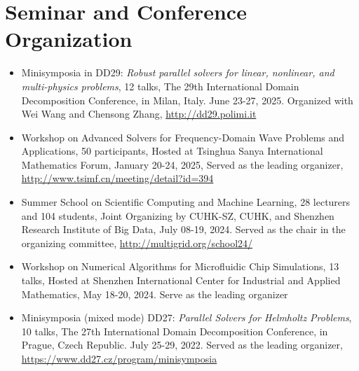 \documentclass[letterpaper]{article}
\begin{document}
\section*{Seminar and Conference Organization}
\begin{itemize}[leftmargin=*]
\item  Minisymposia in DD29: \emph{Robust parallel solvers for linear, nonlinear, and multi-physics problems}, 12 talks,
The 29th International Domain Decomposition Conference, in Milan, Italy. June 23-27, 2025. Organized with Wei Wang and Chensong Zhang, \url{http://dd29.polimi.it}

\item Workshop on Advanced Solvers for Frequency-Domain Wave Problems and Applications, 50 participants, Hosted at Tsinghua Sanya International Mathematics Forum, January 20-24, 2025, Served as the leading organizer,  \url{http://www.tsimf.cn/meeting/detail?id=394} 

\item Summer School on Scientific Computing and Machine Learning, 28 lecturers and 104 students, Joint Organizing by CUHK-SZ, CUHK, and Shenzhen Research Institute of Big Data, July 08-19, 2024. Served as the chair in the organizing committee,  \url{http://multigrid.org/school24/} 
\item Workshop on Numerical Algorithms for
Microfluidic Chip Simulations, 13 talks, Hosted at Shenzhen International Center for Industrial and Applied Mathematics, May 18-20, 2024. Serve as the leading organizer
\item  Minisymposia (mixed mode)  DD27: \emph{Parallel Solvers for Helmholtz Problems}, 10 talks,
The 27th International Domain Decomposition Conference, in Prague, Czech Republic. July 25-29, 2022. Served as the leading organizer, \url{https://www.dd27.cz/program/minisymposia}
\end{itemize}

%
\end{document}
